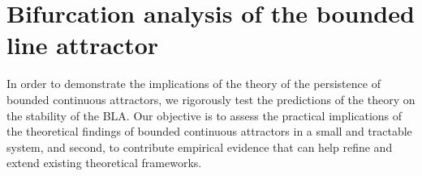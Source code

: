 \documentclass{article} %
\newcounter{ct}
\theoremstyle{definition}
\theoremstyle{remark}
\begin{document}
%


%

\section{Bifurcation analysis of the bounded line attractor}\label{sec:supp:bla}

In order to demonstrate the implications of the theory of the persistence of bounded continuous attractors, we rigorously test the predictions of the theory on the stability of the BLA.
 Our objective is to assess the practical implications of the theoretical findings of bounded continuous attractors in a small and tractable system, and second, to contribute empirical evidence that can help refine and extend existing theoretical frameworks.
\end{document}
